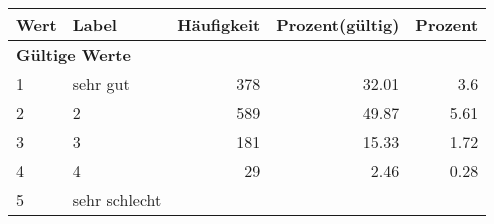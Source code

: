      \begin{longtable}{lXrrr}
     \toprule
     \textbf{Wert} & \textbf{Label} & \textbf{Häufigkeit} & \textbf{Prozent(gültig)} & \textbf{Prozent} \\
     \endhead
     \midrule
     \multicolumn{5}{l}{\textbf{Gültige Werte}}\\

     1 &
     \multicolumn{1}{X}{ sehr gut   } &


       \num{378} &
       \num[round-mode=places,round-precision=2]{32,01} &
         \num[round-mode=places,round-precision=2]{3,6} \\

     2 &
     \multicolumn{1}{X}{ 2   } &


       \num{589} &
       \num[round-mode=places,round-precision=2]{49,87} &
         \num[round-mode=places,round-precision=2]{5,61} \\

     3 &
     \multicolumn{1}{X}{ 3   } &


       \num{181} &
       \num[round-mode=places,round-precision=2]{15,33} &
         \num[round-mode=places,round-precision=2]{1,72} \\

     4 &
     \multicolumn{1}{X}{ 4   } &


       \num{29} &
       \num[round-mode=places,round-precision=2]{2,46} &
         \num[round-mode=places,round-precision=2]{0,28} \\

     5 &
     \multicolumn{1}{X}{ sehr schlecht   } &



\end{longtable}
